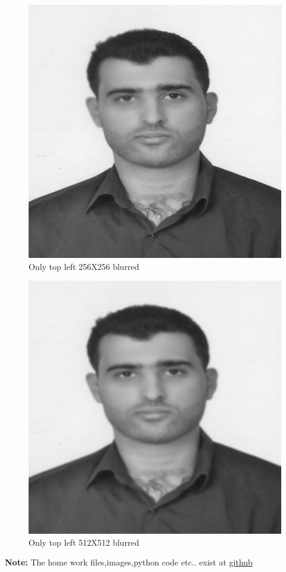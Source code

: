\documentclass{article}
\begin{document}
\begin{figure}[H]
	\includegraphics[scale=1]{blurred_piece_by_piece256.jpg}
	\caption {Only top left 256X256 blurred}
\end{figure}
\begin{figure}[H]
	\includegraphics[scale=1]{blurred_piece_by_piece512.jpg}
	\caption {Only top left 512X512 blurred}
\end{figure}
\textbf{Note: }The home work files,images,python code etc.. exist at \href{https://github.com/aqeel13932/IP/tree/master/hw4}{github}
\end{document}
